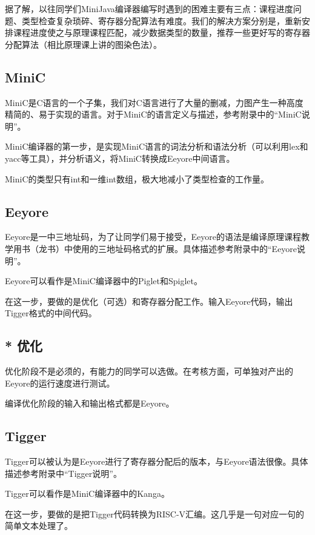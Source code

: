 \documentclass[a4paper]{ctexart}
\begin{document}
据了解，以往同学们MiniJava编译器编写时遇到的困难主要有三点：课程进度问题、类型检查复杂琐碎、寄存器分配算法有难度。我们的解决方案分别是，重新安排课程进度使之与原理课程匹配，减少数据类型的数量，推荐一些更好写的寄存器分配算法（相比原理课上讲的图染色法）。

\subsection{MiniC}

MiniC是C语言的一个子集，我们对C语言进行了大量的删减，力图产生一种高度精简的、易于实现的语言。对于MiniC的语言定义与描述，参考附录中的“MiniC说明”。

MiniC编译器的第一步，是实现MiniC语言的词法分析和语法分析（可以利用lex和yacc等工具），并分析语义，将MiniC转换成Eeyore中间语言。

MiniC的类型只有int和一维int数组，极大地减小了类型检查的工作量。

\subsection{Eeyore}

Eeyore是一中三地址码，为了让同学们易于接受，Eeyore的语法是编译原理课程教学用书（龙书）中使用的三地址码格式的扩展。具体描述参考附录中的“Eeyore说明”。

Eeyore可以看作是MiniC编译器中的Piglet和Spiglet。

在这一步，要做的是优化（可选）和寄存器分配工作。输入Eeyore代码，输出Tigger格式的中间代码。

\subsection{* 优化}

优化阶段不是必须的，有能力的同学可以选做。在考核方面，可单独对产出的Eeyore的运行速度进行测试。

编译优化阶段的输入和输出格式都是Eeyore。

\subsection{Tigger}

Tigger可以被认为是Eeyore进行了寄存器分配后的版本，与Eeyore语法很像。具体描述参考附录中“Tigger说明”。

Tigger可以看作是MiniC编译器中的Kanga。

在这一步，要做的是把Tigger代码转换为RISC-V汇编。这几乎是一句对应一句的简单文本处理了。
\end{document}
